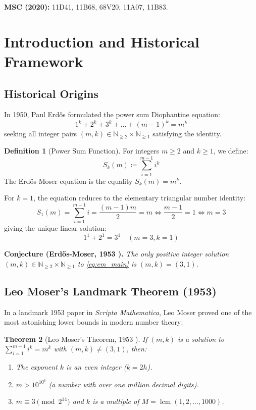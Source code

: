 \documentclass[11pt,a4paper]{article}
\newtheorem{theorem}{Theorem}[section]
\theoremstyle{definition}
\newtheorem{definition}[theorem]{Definition}
\begin{document}
\noindent\textbf{MSC (2020):} 11D41, 11B68, 68V20, 11A07, 11B83.

\tableofcontents
\newpage

\section{Introduction and Historical Framework}

\subsection{Historical Origins}
In 1950, Paul Erd\H{o}s formulated the power sum Diophantine equation:
\begin{equation}\label{eq:em_main}
1^k + 2^k + 3^k + \dots + (m-1)^k = m^k
\end{equation}
seeking all integer pairs $(m, k) \in \mathbb{N}_{\ge 2} \times \mathbb{N}_{\ge 1}$ satisfying the identity.

\begin{definition}[Power Sum Function]\label{def:power_sum}
For integers $m \ge 2$ and $k \ge 1$, we define:
\begin{equation}\label{eq:power_sum_def}
S_k(m) \coloneqq \sum_{i=1}^{m-1} i^k
\end{equation}
The Erd\H{o}s-Moser equation is the equality $S_k(m) = m^k$.
\end{definition}

For $k = 1$, the equation reduces to the elementary triangular number identity:
\[ S_1(m) = \sum_{i=1}^{m-1} i = \frac{(m-1)m}{2} = m \iff \frac{m-1}{2} = 1 \iff m = 3 \]
giving the unique linear solution:
\[ 1^1 + 2^1 = 3^1 \quad (m = 3, k = 1) \]

\noindent\textbf{Conjecture (Erd\H{o}s-Moser, 1953 \cite{moser1953}).} \textit{The only positive integer solution $(m, k) \in \mathbb{N}_{\ge 2} \times \mathbb{N}_{\ge 1}$ to \eqref{eq:em_main} is $(m, k) = (3, 1)$.}

\subsection{Leo Moser's Landmark Theorem (1953)}
In a landmark 1953 paper in \emph{Scripta Mathematica}, Leo Moser \cite{moser1953} proved one of the most astonishing lower bounds in modern number theory:

\begin{theorem}[Leo Moser's Theorem, 1953 \cite{moser1953}]\label{thm:moser}
If $(m, k)$ is a solution to $\sum_{i=1}^{m-1} i^k = m^k$ with $(m, k) \ne (3, 1)$, then:
\begin{enumerate}
    \item The exponent $k$ is an even integer ($k = 2h$).
    \item $m > 10^{10^6}$ (a number with over one million decimal digits).
    \item $m \equiv 3 \pmod{2^{14}}$ and $k$ is a multiple of $M = \operatorname{lcm}(1, 2, \dots, 1000)$.
\end{enumerate}
\end{theorem}
\end{document}
